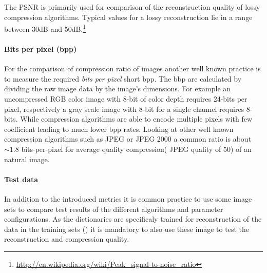 The PSNR is primarily used for comparison of the reconstruction quality of
lossy compression algorithms. Typical values for a lossy reconstruction lie in
a range between 30dB and
50dB.\footnote{\url{http://en.wikipedia.org/wiki/Peak_signal-to-noise_ratio}}

\paragraph{Bits per pixel (bpp)} 
For the comparison of compression ratio of images another well known practice is
to measure the required \emph{bits per pixel} short bpp. The bbp are calculated
by dividing the raw image data by the image's dimensions. For example an
uncompressed RGB color image with 8-bit of color depth requires 24-bits per
pixel, respectively a gray scale image with 8-bit for a single channel requires
8-bits. While compression algorithms are able to encode multiple pixels with few
coefficient leading to much lower bpp rates.
Looking at other well known compression algorithms such as JPEG or
JPEG 2000 a common ratio is about $\sim1.8$ bits-per-pixel for average
quality compression( JPEG quality of 50) of an natural image. 


\paragraph{Test data}
In addition to the introduced metrics it is common practice to use some image
sets to compare test results of the different algorithms and parameter
configurations. As the dictionaries are specificaly trained for
reconstruction of the data in the training sets
() it is mandatory to also use
these image to test the reconstruction and
compression quality. 

